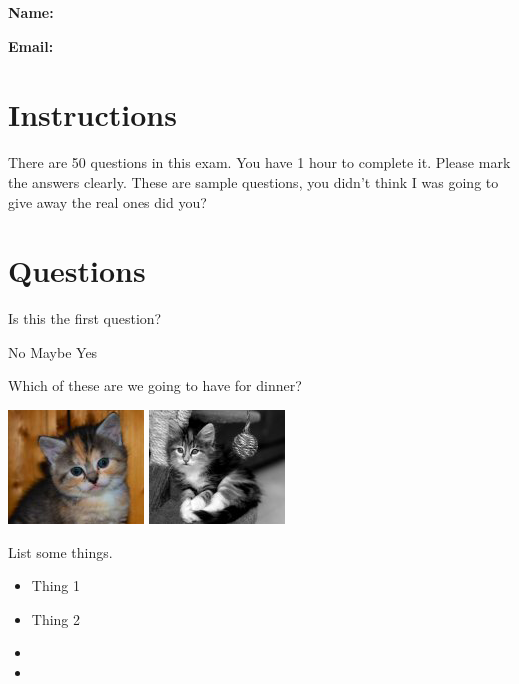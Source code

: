 \documentclass[a4paper,addpoints,noanswers]{exam}
\begin{document}
\textbf{Name:}\enspace\makebox[4in]{\color{gray}\hrulefill}

\vspace{10mm}

\textbf{Email:}\enspace\makebox[4in]{\color{gray}\hrulefill}

\section*{Instructions}
There are 50 questions in this exam. You have 1 hour to complete it. Please mark
the answers clearly. These are sample questions, you didn't think I was going to
give away the real ones did you?

\section*{Questions}
\begin{questions}
\CorrectChoiceEmphasis{\color{red}}

\question Is this the first question?
\begin{checkboxes}
\choice No
\choice Maybe
\CorrectChoice Yes
\end{checkboxes}

\question Which of these are we going to have for dinner?

\begin{oneparcheckboxes}
\CorrectChoice \includegraphics[viewport=0 0 136 114]{kitten_1.png}
\choice \includegraphics[viewport=0 0 136 114]{kitten_2.png}
\end{oneparcheckboxes}

\question List some things.
\begin{itemize}
\ifprintanswers
\color{red}
\item Thing 1
\item Thing 2
\else
\item \enspace\makebox[2in]{\hrulefill}
\item \enspace\makebox[2in]{\hrulefill}
\fi
\end{itemize}

\end{questions}
\end{document}
